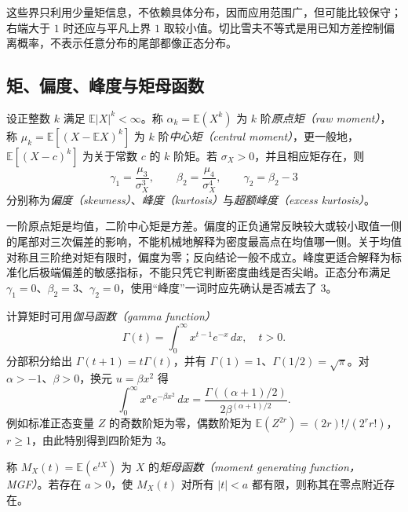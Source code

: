 这些界只利用少量矩信息，不依赖具体分布，因而应用范围广，但可能比较保守；右端大于 $1$ 时还应与平凡上界 $1$ 取较小值。切比雪夫不等式是用已知方差控制偏离概率，不表示任意分布的尾部都像正态分布。

\subsection{矩、偏度、峰度与矩母函数}
\label{subsec:study-moments-mgf}

\begin{definition}
\label{def:study-moments}
设正整数 $k$ 满足 $\mathbb E|X|^k<\infty$。称 $\alpha_k=\mathbb E(X^k)$ 为 $k$ 阶\emph{原点矩（raw moment）}，称 $\mu_k=\mathbb E[(X-\mathbb E X)^k]$ 为 $k$ 阶\emph{中心矩（central moment）}，更一般地，$\mathbb E[(X-c)^k]$ 为关于常数 $c$ 的 $k$ 阶矩。若 $\sigma_X>0$，并且相应矩存在，则
\begin{equation}
  \gamma_1=\frac{\mu_3}{\sigma_X^3},\qquad
  \beta_2=\frac{\mu_4}{\sigma_X^4},\qquad
  \gamma_2=\beta_2-3
  \label{eq:study-skewness-kurtosis}
\end{equation}
分别称为\emph{偏度（skewness）}、\emph{峰度（kurtosis）}与\emph{超额峰度（excess kurtosis）}。
\end{definition}

一阶原点矩是均值，二阶中心矩是方差。偏度的正负通常反映较大或较小取值一侧的尾部对三次偏差的影响，不能机械地解释为密度最高点在均值哪一侧。关于均值对称且三阶绝对矩有限时，偏度为零；反向结论一般不成立。峰度更适合解释为标准化后极端偏差的敏感指标，不能只凭它判断密度曲线是否尖峭。正态分布满足 $\gamma_1=0$、$\beta_2=3$、$\gamma_2=0$，使用“峰度”一词时应先确认是否减去了 $3$。

计算矩时可用\emph{伽马函数（gamma function）}
\[
  \Gamma(t)=\int_0^\infty x^{t-1}e^{-x}\,dx,\quad t>0.
\]
分部积分给出 $\Gamma(t+1)=t\Gamma(t)$，并有 $\Gamma(1)=1$、$\Gamma(1/2)=\sqrt\pi$。对 $\alpha>-1$、$\beta>0$，换元 $u=\beta x^2$ 得
\begin{equation}
  \int_0^\infty x^\alpha e^{-\beta x^2}\,dx
    =\frac{\Gamma((\alpha+1)/2)}{2\beta^{(\alpha+1)/2}}.
  \label{eq:study-gamma-integral}
\end{equation}
例如标准正态变量 $Z$ 的奇数阶矩为零，偶数阶矩为 $\mathbb E(Z^{2r})=(2r)!/(2^rr!)$，$r\ge1$，由此特别得到四阶矩为 $3$。

\begin{definition}
\label{def:study-mgf}
称 $M_X(t)=\mathbb E(e^{tX})$ 为 $X$ 的\emph{矩母函数（moment generating function，MGF）}。若存在 $a>0$，使 $M_X(t)$ 对所有 $|t|<a$ 都有限，则称其在零点附近存在。
\end{definition}

